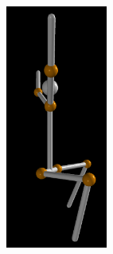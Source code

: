 \documentclass[final]{article}
\begin{document}
\begin{spacing}{1.1}
\begin{center}
  \includegraphics[height=8cm]{fig/myjerkrecons2.png}
\end{center}


\end{spacing}
\end{document}
